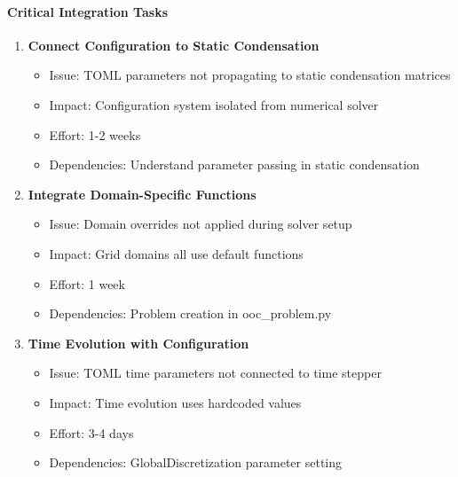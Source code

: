 \paragraph{Critical Integration Tasks}
\begin{enumerate}
    \item \textbf{Connect Configuration to Static Condensation}
    \begin{itemize}
        \item Issue: TOML parameters not propagating to static condensation matrices
        \item Impact: Configuration system isolated from numerical solver
        \item Effort: 1-2 weeks
        \item Dependencies: Understand parameter passing in static condensation
    \end{itemize}
    
    \item \textbf{Integrate Domain-Specific Functions}
    \begin{itemize}
        \item Issue: Domain overrides not applied during solver setup
        \item Impact: Grid domains all use default functions
        \item Effort: 1 week
        \item Dependencies: Problem creation in ooc\_problem.py
    \end{itemize}
    
    \item \textbf{Time Evolution with Configuration}
    \begin{itemize}
        \item Issue: TOML time parameters not connected to time stepper
        \item Impact: Time evolution uses hardcoded values
        \item Effort: 3-4 days
        \item Dependencies: GlobalDiscretization parameter setting
    \end{itemize}
\end{enumerate}

